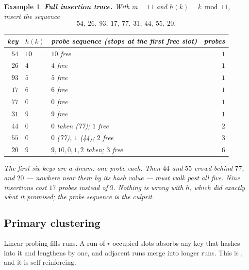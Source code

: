 \documentclass[11pt]{article}
\newtheorem{example}{Example}[section]
\begin{document}
\begin{example}
\textbf{Full insertion trace.} With $m = 11$ and $h(k) = k \bmod 11$, insert
the sequence
\[ 54,\ 26,\ 93,\ 17,\ 77,\ 31,\ 44,\ 55,\ 20 . \]

\begin{center}
{\scriptsize
\begin{tabular}{rlp{6.0cm}r}
  \toprule
  key & $h(k)$ & probe sequence (stops at the first free slot) & probes \\
  \midrule
  $54$ & $10$ & $10$ free & $1$ \\
  $26$ & $4$  & $4$ free & $1$ \\
  $93$ & $5$  & $5$ free & $1$ \\
  $17$ & $6$  & $6$ free & $1$ \\
  $77$ & $0$  & $0$ free & $1$ \\
  $31$ & $9$  & $9$ free & $1$ \\
  $44$ & $0$  & $0$ taken (77); $1$ free & $2$ \\
  $55$ & $0$  & $0$ (77), $1$ (44); $2$ free & $3$ \\
  $20$ & $9$  & $9,10,0,1,2$ taken; $3$ free & $6$ \\
  \bottomrule
\end{tabular}}
\end{center}

The first six keys are a dream: one probe each. Then $44$ and $55$ crowd behind $77$, and $20$ --- nowhere near them by its hash value --- must walk past all five. Nine insertions cost $17$ probes instead of $9$. Nothing is wrong with $h$, which did exactly what it promised; the \emph{probe sequence} is the culprit.
\end{example}

\subsection{Primary clustering}

Linear probing fills runs. A run of $r$ occupied slots absorbs any key that hashes into it and lengthens by one, and adjacent runs merge into longer runs. This is , and it is self-reinforcing.
\end{document}
